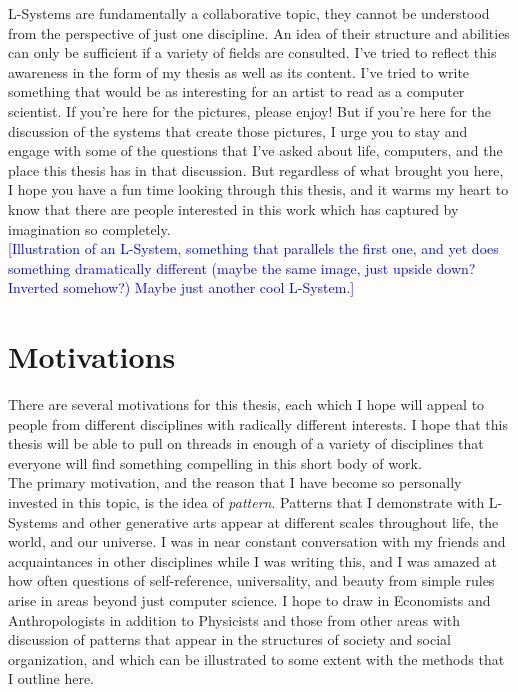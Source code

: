 \documentclass[12pt,twoside]{reedthesis}
\begin{document}
L-Systems are fundamentally a collaborative topic, they cannot be understood from the perspective of just one discipline. An idea of their structure and abilities can only be sufficient if a variety of fields are consulted. I've tried to reflect this awareness in the form of my thesis as well as its content. I've tried to write something that would be as interesting for an artist to read as a computer scientist. If you're here for the pictures, please enjoy! But if you're here for the discussion of the systems that create those pictures, I urge you to stay and engage with some of the questions that I've asked about life, computers, and the place this thesis has in that discussion. But regardless of what brought you here, I hope you have a fun time looking through this thesis, and it warms my heart to know that there are people interested in this work which has captured by imagination so completely.\\


\textcolor{blue}{[Illustration of an L-System, something that parallels the first one, and yet does something dramatically different (maybe the same image, just upside down? Inverted somehow?) Maybe just another cool L-System.]}


\section{Motivations}

There are several motivations for this thesis, each which I hope will appeal to people from different disciplines with radically different interests. I hope that this thesis will be able to pull on threads in enough of a variety of disciplines that everyone will find something compelling in this short body of work.\\

	The primary motivation, and the reason that I have become so personally invested in this topic, is the idea of \textit{pattern}. Patterns that I demonstrate with L-Systems and other generative arts appear at different scales throughout life, the world, and our universe. I was in near constant conversation with my friends and acquaintances in other disciplines while I was writing this, and I was amazed at how often questions of self-reference, universality, and beauty from simple rules arise in areas beyond just computer science. I hope to draw in Economists and Anthropologists in addition to Physicists and those from other areas with discussion of patterns that appear in the structures of society and social organization, and which can be illustrated to some extent with the methods that I outline here.\\
\end{document}
